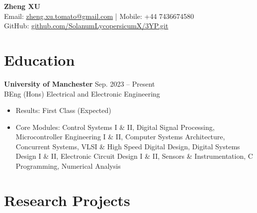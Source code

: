 \documentclass[11pt, a4paper]{article}
\newcommand{\entry}[2]{\textbf{#1} \hfill #2}
\begin{document}
\begin{center}
    {\LARGE \textbf{Zheng XU}} \\[4pt]
    Email: \href{mailto:zheng.xu.tomato@gmail.com}{zheng.xu.tomato@gmail.com} \quad | \quad Mobile: +44 7436674580 \\[2pt]
    GitHub: \href{https://github.com/SolanumLycopersicumX/3YP.git}{github.com/SolanumLycopersicumX/3YP.git}
\end{center}

\section{Education}

\entry{University of Manchester}{Sep. 2023 -- Present} \\
BEng (Hons) Electrical and Electronic Engineering
\begin{itemize}[leftmargin=*, nosep, topsep=2pt]
    \item Results: First Class (Expected)
    \item Core Modules: Control Systems I \& II, Digital Signal Processing, Microcontroller Engineering I \& II, Computer Systems Architecture, Concurrent Systems, VLSI \& High Speed Digital Design, Digital Systems Design I \& II, Electronic Circuit Design I \& II, Sensors \& Instrumentation, C Programming, Numerical Analysis
\end{itemize}

\section{Research Projects}
\end{document}
